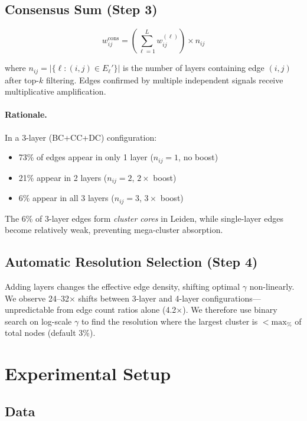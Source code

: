 \documentclass[11pt,a4paper]{article}
\begin{document}
\subsection{Consensus Sum (Step 3)}

\begin{equation}\label{eq:consensus}
    w_{ij}^{\text{cons}} = \left(\sum_{\ell=1}^{L} w_{ij}^{(\ell)}\right) \times n_{ij}
\end{equation}

where $n_{ij} = |\{\ell : (i,j) \in E_\ell'\}|$ is the number of layers containing edge $(i,j)$ after top-$k$ filtering. Edges confirmed by multiple independent signals receive multiplicative amplification.

\paragraph{Rationale.} In a 3-layer (BC+CC+DC) configuration:
\begin{itemize}[nosep]
    \item 73\% of edges appear in only 1 layer ($n_{ij}{=}1$, no boost)
    \item 21\% appear in 2 layers ($n_{ij}{=}2$, $2\times$ boost)
    \item 6\% appear in all 3 layers ($n_{ij}{=}3$, $3\times$ boost)
\end{itemize}
The 6\% of 3-layer edges form \emph{cluster cores} in Leiden, while single-layer edges become relatively weak, preventing mega-cluster absorption.

\subsection{Automatic Resolution Selection (Step 4)}

Adding layers changes the effective edge density, shifting optimal $\gamma$ non-linearly. We observe 24--32$\times$ shifts between 3-layer and 4-layer configurations---unpredictable from edge count ratios alone (4.2$\times$). We therefore use binary search on log-scale $\gamma$ to find the resolution where the largest cluster is $<\text{max}_\%$ of total nodes (default 3\%).

\section{Experimental Setup}

\subsection{Data}
\end{document}
